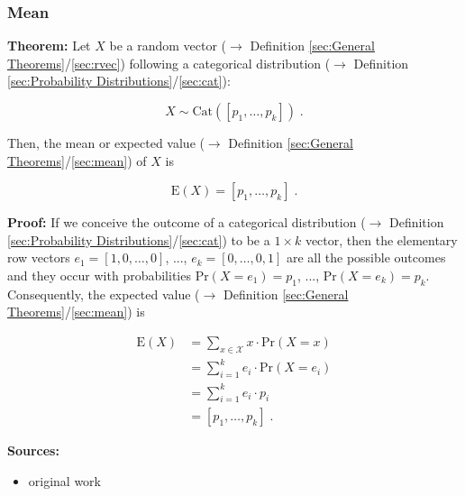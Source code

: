\documentclass[a4paper,12pt,twoside]{book}
\begin{document}
\subsubsection[\textbf{Mean}]{Mean} \label{sec:cat-mean}
\setcounter{equation}{0}

\textbf{Theorem:} Let $X$ be a random vector ($\rightarrow$ Definition \ref{sec:General Theorems}/\ref{sec:rvec}) following a categorical distribution ($\rightarrow$ Definition \ref{sec:Probability Distributions}/\ref{sec:cat}):

\begin{equation} \label{eq:cat-mean-cat}
X \sim \mathrm{Cat}(\left[p_1, \ldots, p_k \right]) \; .
\end{equation}

Then, the mean or expected value ($\rightarrow$ Definition \ref{sec:General Theorems}/\ref{sec:mean}) of $X$ is

\begin{equation} \label{eq:cat-mean-cat-mean}
\mathrm{E}(X) = \left[p_1, \ldots, p_k \right] \; .
\end{equation}


\vspace{1em}
\textbf{Proof:} If we conceive the outcome of a categorical distribution ($\rightarrow$ Definition \ref{sec:Probability Distributions}/\ref{sec:cat}) to be a $1 \times k$ vector, then the elementary row vectors $e_1 = \left[1, 0, \ldots, 0 \right]$, ..., $e_k = \left[0, \ldots, 0, 1 \right]$ are all the possible outcomes and they occur with probabilities $\mathrm{Pr}(X = e_1) = p_1$, ..., $\mathrm{Pr}(X = e_k) = p_k$. Consequently, the expected value ($\rightarrow$ Definition \ref{sec:General Theorems}/\ref{sec:mean}) is

\begin{equation} \label{eq:cat-mean-cat-mean-qed}
\begin{split}
\mathrm{E}(X) &= \sum_{x \in \mathcal{X}} x \cdot \mathrm{Pr}(X = x) \\
&= \sum_{i=1}^k e_i \cdot \mathrm{Pr}(X = e_i) \\
&= \sum_{i=1}^k e_i \cdot p_i \\
&= \left[p_1, \ldots, p_k \right] \; .
\end{split}
\end{equation}


\vspace{1em}
\textbf{Sources:}
\begin{itemize}
\item original work\end{itemize}
\end{document}
